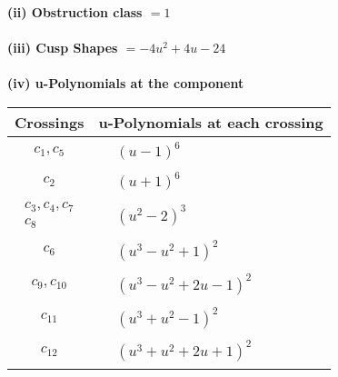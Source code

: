 \documentclass[1p]{elsarticle_modified}
\theoremstyle{definition}
\begin{document}
\flushleft \textbf{(ii) Obstruction class $= 1$}\\~\\
\flushleft \textbf{(iii) Cusp Shapes $= -4 u^2+4 u-24$}\\~\\
\newpage\renewcommand{\arraystretch}{1}
\flushleft \textbf{(iv) u-Polynomials at the component}\newline \\
\begin{tabular}{m{50pt}|m{274pt}}
Crossings & \hspace{64pt}u-Polynomials at each crossing \\
\hline $$\begin{aligned}c_{1},c_{5}\end{aligned}$$&$\begin{aligned}
&(u-1)^6
\end{aligned}$\\
\hline $$\begin{aligned}c_{2}\end{aligned}$$&$\begin{aligned}
&(u+1)^6
\end{aligned}$\\
\hline $$\begin{aligned}c_{3},c_{4},c_{7}\\c_{8}\end{aligned}$$&$\begin{aligned}
&(u^2-2)^3
\end{aligned}$\\
\hline $$\begin{aligned}c_{6}\end{aligned}$$&$\begin{aligned}
&(u^3- u^2+1)^2
\end{aligned}$\\
\hline $$\begin{aligned}c_{9},c_{10}\end{aligned}$$&$\begin{aligned}
&(u^3- u^2+2 u-1)^2
\end{aligned}$\\
\hline $$\begin{aligned}c_{11}\end{aligned}$$&$\begin{aligned}
&(u^3+u^2-1)^2
\end{aligned}$\\
\hline $$\begin{aligned}c_{12}\end{aligned}$$&$\begin{aligned}
&(u^3+u^2+2 u+1)^2
\end{aligned}$\\
\hline
\end{tabular}\\~\\
\end{document}
